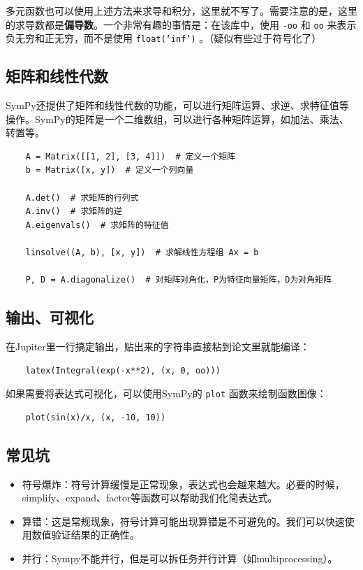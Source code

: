 多元函数也可以使用上述方法来求导和积分，这里就不写了。需要注意的是，这里的求导数都是\textbf{偏导数}。一个非常有趣的事情是：在该库中，使用 \texttt{-oo} 和 \texttt{oo} 来表示负无穷和正无穷，而不是使用 \texttt{float('inf')} 。（疑似有些过于符号化了）

\subsection{矩阵和线性代数}
SymPy还提供了矩阵和线性代数的功能，可以进行矩阵运算、求逆、求特征值等操作。SymPy的矩阵是一个二维数组，可以进行各种矩阵运算，如加法、乘法、转置等。
\begin{verbatim}
    A = Matrix([[1, 2], [3, 4]])  # 定义一个矩阵
    b = Matrix([x, y])  # 定义一个列向量

    A.det()  # 求矩阵的行列式
    A.inv()  # 求矩阵的逆
    A.eigenvals()  # 求矩阵的特征值

    linsolve((A, b), [x, y])  # 求解线性方程组 Ax = b

    P, D = A.diagonalize()  # 对矩阵对角化，P为特征向量矩阵，D为对角矩阵
\end{verbatim}

\subsection{输出、可视化}
在Jupiter里一行搞定输出，贴出来的字符串直接粘到论文里就能编译：
\begin{verbatim}
    latex(Integral(exp(-x**2), (x, 0, oo)))
\end{verbatim}

如果需要将表达式可视化，可以使用SymPy的 \texttt{plot} 函数来绘制函数图像：
\begin{verbatim}
    plot(sin(x)/x, (x, -10, 10))
\end{verbatim}

\subsection{常见坑}
\begin{itemize}
  \item 符号爆炸：符号计算缓慢是正常现象，表达式也会越来越大。必要的时候，simplify、expand、factor等函数可以帮助我们化简表达式。
  \item 算错：这是常规现象，符号计算可能出现算错是不可避免的。我们可以快速使用数值验证结果的正确性。
  \item 并行：Sympy不能并行，但是可以拆任务并行计算（如multiprocessing）。
\end{itemize}

